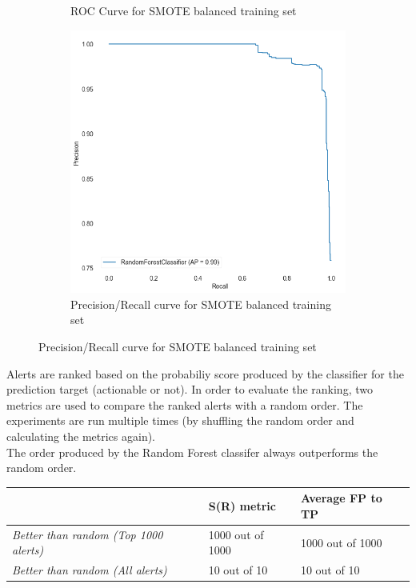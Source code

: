 \begin{figure}[H]
\begin{subfigure}{.5\textwidth}
		\caption{ROC Curve for SMOTE balanced training set}\label{}
	\end{subfigure}%
	\begin{subfigure}{.5\textwidth}
		\centering
		\includegraphics[scale=0.3]{./src/actAlerts/actalerts_smote_pr.png}
		\caption{Precision/Recall curve for SMOTE balanced training set}\label{}
	\end{subfigure}  
\end{figure}

Alerts are ranked based on the probabiliy score produced by the classifier for the prediction target (actionable or not).
In order to evaluate the ranking, two metrics are used to compare the ranked alerts with a random order. The experiments are run multiple times (by shuffling the random order and calculating the metrics again).\\

The order produced by the Random Forest classifer always outperforms the random order.
\begin{table}[H]
	\centering
	\begin{tabular}{@{}lll@{}}
		\toprule
		& \textbf{S(R) metric} & \textbf{Average FP to TP} \\ \midrule
		\textit{Better than random (Top 1000 alerts)} & 1000 out of 1000     & 1000 out of 1000          \\
		\textit{Better than random (All alerts)}      & 10 out of 10         & 10 out of 10              \\ \bottomrule
	\end{tabular}
\end{table}

